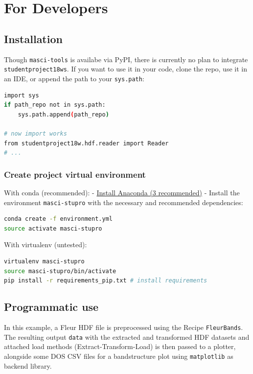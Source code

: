 \section{For Developers}\label{for-developers}

\subsection{Installation}\label{installation-1}

Though \texttt{masci-tools} is availabe via PyPI, there is currently no
plan to integrate \texttt{studentproject18ws}. If you want to use it in
your code, clone the repo, use it in an IDE, or append the path to your
\texttt{sys.path}:

\begin{lstlisting}[language=bash, style=code]
import sys
if path_repo not in sys.path:
    sys.path.append(path_repo)
    
# now import works
from studentproject18w.hdf.reader import Reader
# ...
\end{lstlisting}

\subsubsection{Create project virtual
environment}\label{create-project-virtual-environment}

With conda (recommended): -
\href{https://www.anaconda.com/download}{Install Anaconda (3
recommended)} - Install the environment \texttt{masci-stupro} with the
necessary and recommended dependencies:

\begin{lstlisting}[language=bash, style=code]
conda create -f environment.yml
source activate masci-stupro
\end{lstlisting}

With virtualenv (untested):

\begin{lstlisting}[language=bash, style=code]
virtualenv masci-stupro
source masci-stupro/bin/activate
pip install -r requirements_pip.txt # install requirements
\end{lstlisting}

\subsection{Programmatic use}\label{programmatic-use}

In this example, a Fleur HDF file is preprocessed using the Recipe
\texttt{FleurBands}. The resulting output \texttt{data} with the
extracted and transformed HDF datasets and attached load methods
(Extract-Transform-Load) is then passed to a plotter, alongside some DOS
CSV files for a bandstructure plot using \texttt{matplotlib} as backend
library.

